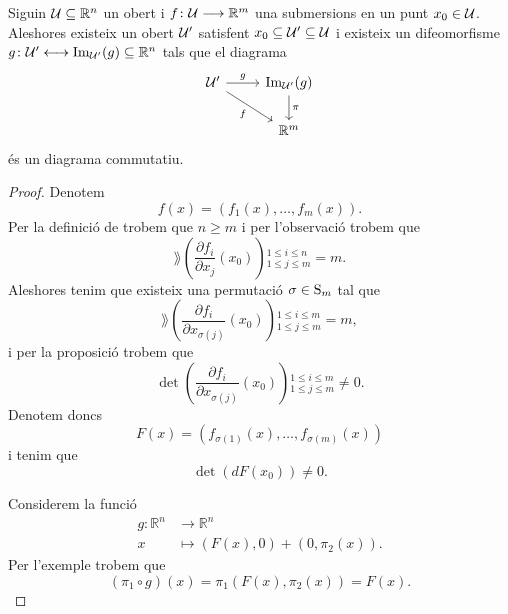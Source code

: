 \documentclass[../Apunts.tex]{subfiles}
\begin{document}
	\begin{theorem}
		\label{thm:Teorema d'estructura local de les submersions}
		Siguin \(\mathcal{U}\subseteq\mathbb{R}^{n}\) un obert i \(f\colon\mathcal{U}\longrightarrow\mathbb{R}^{m}\) una submersions en un punt \(x_{0}\in\mathcal{U}\). Aleshores existeix un obert \(\mathcal{U}'\) satisfent \(x_{0}\subseteq\mathcal{U}'\subseteq\mathcal{U}\) i existeix un difeomorfisme \(g\colon\mathcal{U}'\longleftrightarrow\operatorname{Im}_{\mathcal{U}'}(g)\subseteq\mathbb{R}^{n}\) tals que el diagrama
		\[\begin{tikzcd}
			\obert{U}' \arrow{r}{g} \arrow[swap]{dr}{f} & \Ima_{\obert{U}'}(g) \arrow{d}{\pi} \\
			& \mathbb{R}^{m}
		\end{tikzcd}\]
		és un diagrama commutatiu.
		\begin{proof}
			Denotem
			\[f(x)=(f_{1}(x),\dots,f_{m}(x)).\]
			Per la definició de  trobem que \(n\geq m\) i per l'observació  trobem que
			\[\rang\left(\frac{\partial f_{i}}{\partial x_{j}}(x_{0})\right){}_{1\leq j\leq m}^{1\leq i\leq n}=m.\]
			Aleshores tenim que existeix una permutació \(\sigma\in\operatorname{S}_{m}\) tal que
			\[\rang\left(\frac{\partial f_{i}}{\partial x_{\sigma(j)}}(x_{0})\right){}_{1\leq j\leq m}^{1\leq i\leq m}=m,\]
			i per la proposició  trobem que
			\[\det\left(\frac{\partial f_{i}}{\partial x_{\sigma(j)}}(x_{0})\right){}_{1\leq j\leq m}^{1\leq i\leq m}\neq0.\]
			Denotem doncs
			\[F(x)=(f_{\sigma(1)}(x),\dots,f_{\sigma(m)}(x))\]
			i tenim que
			\begin{equation}
				\label{thm:Teorema d'estructura local de les submersions:eq:1}
				\det(dF(x_{0}))\neq0.
			\end{equation}
			
			Considerem la funció
			\begin{align*}
				g\colon\mathbb{R}^{n}&\longrightarrow\mathbb{R}^{n} \\
				x&\longmapsto(F(x),0)+(0,\pi_{2}(x)).
			\end{align*}
			Per l'exemple  trobem que
			\[(\pi_{1}\circ g)(x)=\pi_{1}(F(x),\pi_{2}(x))=F(x).\]
			

\end{proof}
\end{theorem}
\end{document}
